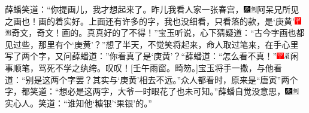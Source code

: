 薛蟠笑道：“你提画儿，我才想起来了。昨儿我看人家一张春宫，{\includegraphics[width=3mm]{../Images/00004}\includegraphics[width=3mm]{../Images/00011}\footnotesize \kaishu 阿呆兄所见之画也！}画的着实好。上面还有许多的字，我也没细看，只看落的款，是‘庚黄’{\includegraphics[width=3mm]{../Images/00002}\includegraphics[width=3mm]{../Images/00011}\footnotesize \kaishu 奇文，奇文！}画的。真真好的了不得！”宝玉听说，心下猜疑道：“古今字画也都见过些，那里有个‘庚黄’？”想了半天，不觉笑将起来，命人取过笔来，在手心里写了两个字，又问薛蟠道：”你看真了是‘庚黄’？“薛蟠道：“怎么看不真！”{\includegraphics[width=3mm]{../Images/00002}\includegraphics[width=3mm]{../Images/00010}\footnotesize \kaishu 闲事顺笔，骂死不学之纨绔。叹叹！{[}壬午雨窗。畸笏。{]}}宝玉将手一撒，与他看道：“别是这两个字罢？其实与‘庚黄’相去不远。”众人都看时，原来是“唐寅”两个字，都笑道：“想必是这两字，大爷一时眼花了也未可知。”薛蟠自觉没意思，{\includegraphics[width=3mm]{../Images/00004}\includegraphics[width=3mm]{../Images/00011}\footnotesize \kaishu 实心人。}笑道：“谁知他‘糖银’‘果银’的。”


